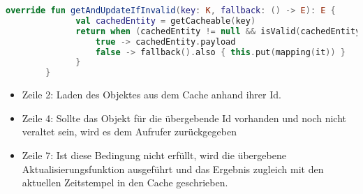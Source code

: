 \begin{minipage}{\linewidth} %
	\begin{lstlisting}[caption={Preisadapter mit Caching-Funktion}, label={lst:repository}, language=Kotlin]
		override fun getAndUpdateIfInvalid(key: K, fallback: () -> E): E {
			  val cachedEntity = getCacheable(key)
			  return when (cachedEntity != null && isValid(cachedEntity)) {
			  	  true -> cachedEntity.payload
			  	  false -> fallback().also { this.put(mapping(it)) }
			  }
		}
	\end{lstlisting}
\end{minipage}

\begin{itemize}[noitemsep,nolistsep]
	\item Zeile 2: Laden des Objektes aus dem Cache anhand ihrer Id.
	\item Zeile 4: Sollte das Objekt für die übergebende Id  vorhanden und noch nicht veraltet sein, wird es dem Aufrufer zurückgegeben
	\item Zeile 7: Ist diese Bedingung nicht erfüllt, wird die übergebene Aktualisierungsfunktion ausgeführt und das Ergebnis zugleich mit den aktuellen Zeitstempel in den Cache geschrieben.
\end{itemize}


